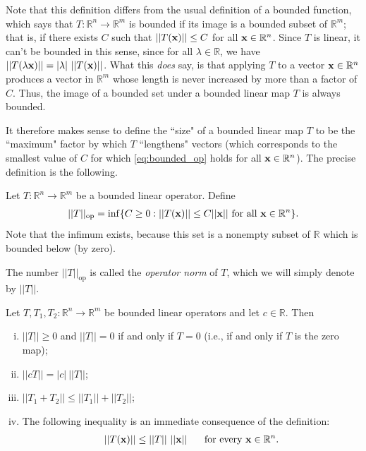 \documentclass[12pt,letterpaper,reqno]{article}
\numberwithin{equation}{section}
\newcommand{\R}{\ensuremath{\mathbb R}}
\newcommand{\bx}{{\bf x}}
\newcommand{\fixme}[1]{{\color{orange}{[#1]}}}
\begin{document}
{Note that this definition differs from the usual definition of a bounded function, which says that $T:\R^n \to \R^m$ is bounded if its image is a bounded subset of $\R^m$; that is, if there exists $C$ such that $||T(\bx)||\leq C$ for all $\bx \in \R^n$. Since $T$ is linear, it can't be bounded in this sense, since for all $\lambda \in \R$, we have $||T(\lambda \bx)||=|\lambda| \ ||T(\bx)||$. What this \emph{does} say, is that applying $T$ to a vector $\bx \in \R^n$ produces a vector in $\R^m$ whose length is never increased by more than a factor of $C$. Thus, the image of a bounded set under a bounded linear map $T$ is always bounded.

It therefore makes sense to define the ``size" of a bounded linear map $T$ to be the ``maximum" factor by which $T$ ``lengthens" vectors (which corresponds to the smallest value of $C$ for which \eqref{eq:bounded_op} holds for all $\bx \in \R^n$). The precise definition is the following.

\begin{defn}
	Let $T:\R^n \to \R^m$ be a bounded linear operator. Define
	\begin{align*}
		||T||_\text{op}=\inf\{C\geq 0:||T(\bx)||\leq C||\bx|| \text{ for all } \bx \in \R^n\}.
	\end{align*}
	Note that the infimum exists, because this set is a nonempty subset of $\R$ which is bounded below (by zero).
	
	The number $||T||_\text{op}$ is called the \emph{operator norm} of $T$, which we will simply denote by $||T||$.
\end{defn}

\fixme{Example?}

\begin{prop}
	Let $T,T_1,T_2:\R^n \to \R^m$ be bounded linear operators and let $c \in \R$. Then
	\begin{enumerate}[(i)]
		\item $||T|| \geq 0$ and $||T||=0$ if and only if $T=0$ (i.e., if and only if $T$ is the zero map);
		\item $||cT||=|c| \ ||T||$;
		\item $||T_1+T_2||\leq ||T_1||+||T_2||$;
		\item The following inequality is an immediate consequence of the definition:
		\begin{align*}
			||T(\bx)||\leq ||T|| \ ||\bx|| \hspace{0.5cm} \text{ for every } \bx \in \R^n.
		\end{align*}
	\end{enumerate}
\end{prop}

}
\end{document}
